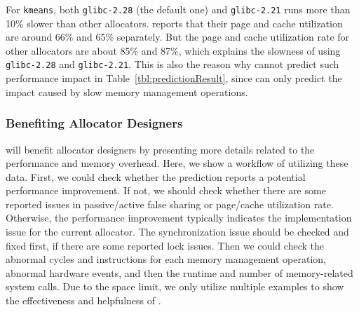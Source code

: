 For \texttt{kmeans}, both \texttt{glibc-2.28} (the default one) and \texttt{glibc-2.21} runs more than  10\% slower than other allocators. \MP{} reports that their page and cache utilization are around 66\% and 65\% separately. But the page and cache utilization rate for other allocators are about 85\% and 87\%, which explains the slowness of using \texttt{glibc-2.28} and \texttt{glibc-2.21}. This is also the reason why \MP{} cannot predict such performance impact in Table~\ref{tbl:predictionResult}, since \MP{} can only predict the impact caused by slow memory management operations. 


\subsubsection{Benefiting Allocator Designers}
\label{sec: benifitdesigners}
\MP{} will benefit allocator designers by presenting more details related to the performance and memory overhead. Here, we show a workflow of utilizing these data. First, we could check whether the prediction reports a potential performance improvement. If not, we should check whether there are some reported issues in passive/active false sharing or page/cache utilization rate. Otherwise, the performance improvement typically indicates the implementation issue for the current allocator. The synchronization issue should be checked and fixed first, if there are some reported lock issues. Then we could check the abnormal cycles and instructions for each memory management operation, abnormal hardware events, and then the runtime and number of memory-related system calls. Due to the space limit, we only utilize multiple examples to show the effectiveness and helpfulness of \MP{}. 


